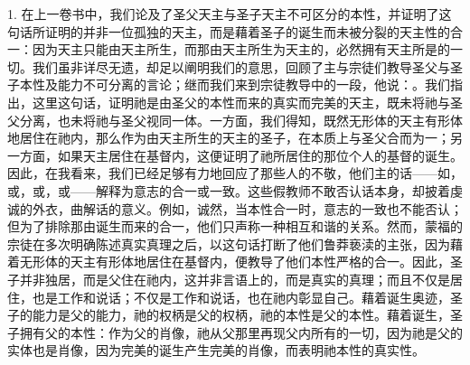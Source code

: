 1. 在上一卷书中，我们论及了圣父天主与圣子天主不可区分的本性，并证明了这句话所证明的并非一位孤独的天主，而是藉着圣子的诞生而未被分裂的天主性的合一：因为天主只能由天主所生，而那由天主所生为天主的，必然拥有天主所是的一切。我们虽非详尽无遗，却足以阐明我们的意思，回顾了主与宗徒们教导圣父与圣子本性及能力不可分离的言论；继而我们来到宗徒教导中的一段，他说：。我们指出，这里这句话，证明祂是由圣父的本性而来的真实而完美的天主，既未将祂与圣父分离，也未将祂与圣父视同一体。一方面，我们得知，既然无形体的天主有形体地居住在祂内，那么作为由天主所生的天主的圣子，在本质上与圣父合而为一；另一方面，如果天主居住在基督内，这便证明了祂所居住的那位个人的基督的诞生。因此，在我看来，我们已经足够有力地回应了那些人的不敬，他们主的话——如，或，或，或——解释为意志的合一或一致。这些假教师不敢否认话本身，却披着虔诚的外衣，曲解话的意义。例如，诚然，当本性合一时，意志的一致也不能否认；但为了排除那由诞生而来的合一，他们只声称一种相互和谐的关系。然而，蒙福的宗徒在多次明确陈述真实真理之后，以这句话打断了他们鲁莽亵渎的主张，因为藉着无形体的天主有形体地居住在基督内，便教导了他们本性严格的合一。因此，圣子并非独居，而是父住在祂内，这并非言语上的，而是真实的真理；而且不仅是居住，也是工作和说话；不仅是工作和说话，也在祂内彰显自己。藉着诞生奥迹，圣子的能力是父的能力，祂的权柄是父的权柄，祂的本性是父的本性。藉着诞生，圣子拥有父的本性：作为父的肖像，祂从父那里再现父内所有的一切，因为祂是父的实体也是肖像，因为完美的诞生产生完美的肖像，而表明祂本性的真实性。\par

